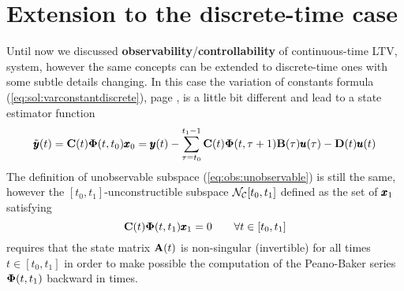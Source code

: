 \section{Extension to the discrete-time case}
	Until now we discussed \textbf{observability}/\textbf{controllability} of continuous-time LTV, system, however the same concepts can be extended to discrete-time ones with some subtle details changing. In this case the variation of constants formula (\ref{eq:sol:varconstantdiscrete}), page \pageref{eq:sol:varconstantdiscrete}, is a little bit different and lead to a state estimator function 
	\[ \tilde {\pmb{y}}(t) = \mathbf{C}(t) \mathbf{\Phi}(t,t_0)\pmb{x}_0 = \pmb{y}(t) - \sum_{\tau = t_0}^{t_1-1} \mathbf{C}(t)\mathbf{\Phi}(t,\tau+1) \mathbf{B}(\tau) \pmb{u}(\tau) - \mathbf{D}(t)\pmb{u}(t) \]
	The definition of unobservable subspace (\ref{eq:obs:unobservable}) is still the same, however the $[t_0,t_1]$-unconstructible subspace $\mathcal{N_C}[t_0,t_1]$ defined as the set of $\pmb{x}_1$ satisfying
	\[ \mathbf{C}(t) \mathbf{\Phi}(t,t_1) \pmb{x}_1 = 0 \qquad \forall t\in [t_0,t_1] \]
	requires that the state matrix $\mathbf{A}(t)$ is non-singular (invertible) for all times $t\in[t_0,t_1]$ in order to make possible the computation of the Peano-Baker series $\mathbf{\Phi}(t,t_1)$ backward in times.
	
